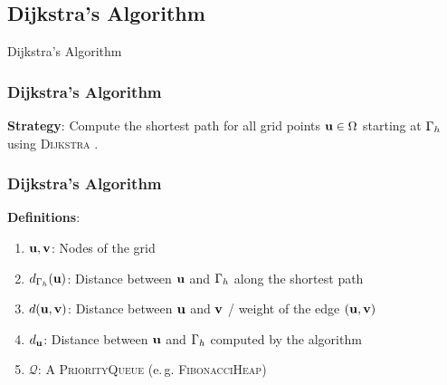 \documentclass[aspectratio=169,handout]{beamer}
\begin{document}
\subsection{Dijkstra's Algorithm}
\begin{frame}[plain]
	\begin{center}
		{\color{myblue} \huge Dijkstra's Algorithm}
	\end{center}
\end{frame}

\begin{frame}
	\frametitle{Dijkstra's Algorithm}
	\textbf{Strategy}: Compute the shortest path for all grid points $\mathbf{u} \in \Omega$ starting at $\Gamma_h$ using \textsc{Dijkstra} \cite{dijkstra-1959}.\\
	\vspace{1cm}
	
\end{frame}

\begin{frame}
	\frametitle{Dijkstra's Algorithm}
	\textbf{Definitions}: 
	\begin{enumerate}[label=(\roman*)]
		\item $\mathbf{u}, \mathbf{v}$: Nodes of the grid
		\item $d_{\Gamma_h}(\mathbf{u})$: Distance between $\mathbf{u}$ and $\Gamma_h$ along the shortest path
		\item $d(\mathbf{u}, \mathbf{v})$: Distance between $\mathbf{u}$ and $\mathbf{v}$ / weight of the edge $(\mathbf{u}, \mathbf{v})$
		\item $d_{\mathbf{u}}$: Distance between $\mathbf{u}$ and $\Gamma_h$ computed by the algorithm
		\item $\mathcal{Q}$: A \textsc{PriorityQueue} (e.\,g. \textsc{FibonacciHeap})
	\end{enumerate}
\end{frame}

%	
\end{document}
